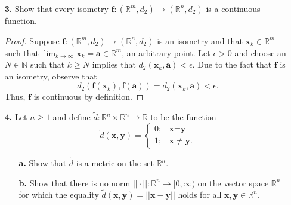 \documentclass[ 12pt ]{article}
\begin{document}
\begin{enumerate}
	\item[\textbf{3.}] Show that every isometry $\textbf{f} : (\mathbb{R}^m, d_2) \to (\mathbb{R}^n, d_2)$ is a continuous function.

		\begin{proof}
			Suppose $\textbf{f} : (\mathbb{R}^m, d_2) \to (\mathbb{R}^n, d_2)$ is an isometry and that $\textbf{x}_k \in \mathbb{R}^m$ such that $\lim_{k \to \infty} \textbf{x}_k =
			\textbf{a} \in \mathbb{R}^m$, an arbitrary point. Let $\epsilon > 0$ and choose an $N \in \mathbb{N}$ such that $k \geq N$ implies that $d_2(\textbf{x}_k, \textbf{a}) <
			\epsilon.$ Due to the fact that $\textbf{f}$ is an isometry, observe that $$d_2(\textbf{f}(\textbf{x}_k), \textbf{f}(\textbf{a})) = d_2(\textbf{x}_k, \textbf{a}) <
			\epsilon.$$ Thus, $\textbf{f}$ is continuous by definition.
		\end{proof}


	\item[\textbf{4.}] Let $n \geq 1$ and define $\widetilde{d} : \mathbb{R}^n \times \mathbb{R}^n \to \mathbb{R}$ to be the function \[ \widetilde{d}(\textbf{x}, \textbf{y}) =
		\begin{cases} 0; &\textbf{x} = \textbf{y} \\ 1; &\textbf{x} \neq \textbf{y}. \end{cases} \]
		\begin{enumerate}
			\item[\textbf{a.}] Show that $\widetilde{d}$ is a metric on the set $\mathbb{R}^n$.
			\item[\textbf{b.}] Show that there is no norm $||\cdot|| : \mathbb{R}^n \to [0, \infty)$ on the vector space $\mathbb{R}^n$ for which the equality $\widetilde{d}(\textbf{x},
				\textbf{y}) = ||\textbf{x} - \textbf{y}||$ holds for all $\textbf{x}, \textbf{y} \in \mathbb{R}^n$.
		\end{enumerate}


\end{enumerate}
\end{document}
